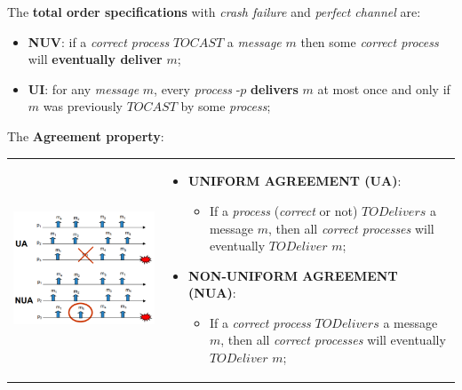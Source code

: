 \documentclass{article}
\begin{document}
The \textbf{total order specifications} with \emph{crash failure} and \emph{perfect channel} are:
\begin{itemize}
\item \textbf{NUV}: if a \emph{correct process} $TOCAST$ a \emph{message} $m$ then some \emph{correct process} will \textbf{eventually deliver} $m$;
\item \textbf{UI}: for any \emph{message} $m$, every \emph{process} -$p$ \textbf{delivers} $m$ at most once and only if $m$ was previously $TOCAST$ by some \emph{process};
\end{itemize}
The \textbf{Agreement property}:\\
\begin{tabular}{C{5cm}  L{10.5cm}}
        \includegraphics[scale=0.95]{cattura56.png} & 
\begin{itemize}
\item \textbf{UNIFORM AGREEMENT (UA)}:
\begin{itemize}
\item If a \emph{process} (\emph{correct} or not) $TODelivers$ a message $m$, then all \emph{correct processes} will eventually $TODeliver$ $m$;
\end{itemize}
\item \textbf{NON-UNIFORM AGREEMENT (NUA)}:
\begin{itemize}
\item If a \emph{correct process} $TODelivers$ a message $m$, then all \emph{correct processes} will eventually $TODeliver$ $m$;
\end{itemize}
\end{itemize}
\end{tabular}\clearpage
\end{document}
